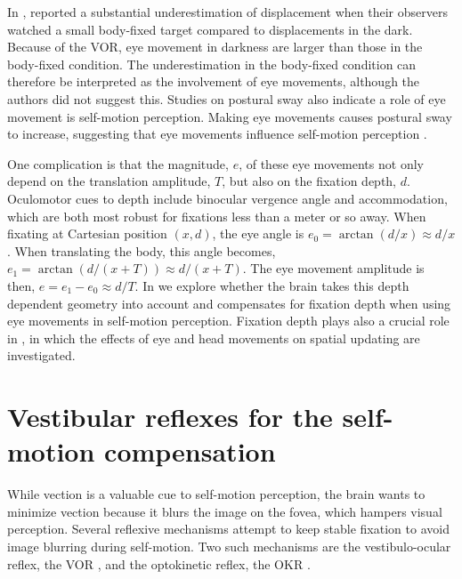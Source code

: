 In , \citeauthor{guedry1963} reported a substantial underestimation of displacement when their observers watched a small body-fixed target compared to displacements in the dark. Because of the VOR, eye movement in darkness are larger than those in the body-fixed condition. The underestimation in the body-fixed condition can therefore be interpreted as the involvement of eye movements, although the authors did not suggest this. Studies on postural sway also indicate a role of eye movement is self-motion perception. Making eye movements causes postural sway to increase, suggesting that eye movements influence self-motion perception \cite{glasauer2005,rodrigues2015}.

One complication is that the magnitude, $e$, of these eye movements not only depend on the translation amplitude, $T$, but also on the fixation depth, $d$. Oculomotor cues to depth include binocular vergence angle and accommodation, which are both most robust for fixations less than a meter or so away. When fixating at Cartesian position $(x, d)$, the eye angle is $e_0 = \arctan(d/x) \approx d/x$. When translating the body, this angle becomes, $e_1 = \arctan(d/(x+T)) \approx d/(x+T)$. The eye movement amplitude is then, $e = e_1 - e_0 \approx d/T$. In  we explore whether the brain takes this depth dependent geometry into account and compensates for fixation depth when using eye movements in self-motion perception. Fixation depth plays also a crucial role in , in which the effects of eye and head movements on spatial updating are investigated.


\section{Vestibular reflexes for the self-motion compensation}
While vection is a valuable cue to self-motion perception, the brain wants to minimize vection because it blurs the image on the fovea, which hampers visual perception. Several reflexive mechanisms attempt to keep stable fixation to avoid image blurring during self-motion. Two such mechanisms are the vestibulo-ocular reflex, the VOR \cite{goldberg2012}, and the optokinetic reflex, the OKR \cite{purves2012}.

